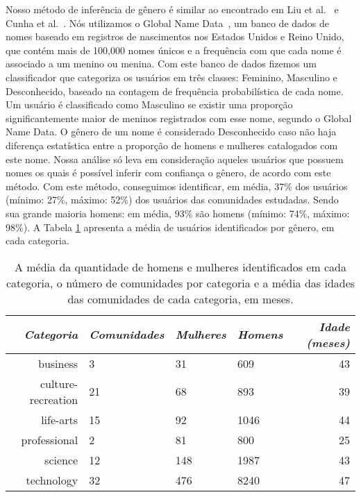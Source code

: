 Nosso método de inferência de gênero é similar ao encontrado em Liu et al.~\cite{liu2013s} e Cunha et al.~\cite{cunha2014he}. Nós utilizamos o Global Name Data~\cite{Hyland:2013:Online}, um banco de dados de nomes baseado em registros de nascimentos nos Estados Unidos e Reino Unido, que contém mais de 100,000 nomes únicos e a frequência com que cada nome é associado a um menino ou menina. Com este banco de dados fizemos um classificador que categoriza os usuários em três classes: Feminino, Masculino e Desconhecido, baseado na contagem de frequência probabilística de cada nome. Um usuário é classificado como Masculino se existir uma proporção significantemente maior de meninos registrados com esse nome, segundo o Global Name Data. O gênero de um nome é considerado Desconhecido caso não haja diferença estatística entre a proporção de homens e mulheres catalogados com este nome. Nossa análise só leva em consideração aqueles usuários que possuem nomes os quais é possível inferir com confiança o gênero, de acordo com este método. Com este método, conseguimos identificar, em média, 37\% dos usuários (mínimo: 27\%, máximo: 52\%) dos usuários das comunidades estudadas. Sendo sua grande maioria homens: em média, 93\% são homens (mínimo: 74\%, máximo: 98\%). A Tabela \ref{table:categories} apresenta a média de usuários identificados por gênero, em cada categoria.

\begin{table}[h]
\centering
\begin{tabular}{@{}rlllr@{}}
\toprule
{\small\textit{Categoria}} & {\small \textit{Comunidades}} & {\small \textit{Mulheres}} & {\small \textit{Homens}} & {\small \textit{Idade (meses)}} \\ \midrule
business           & 3  & 31  & 609  & 43 \\
culture-recreation & 21 & 68  & 893  & 39 \\
life-arts          & 15 & 92  & 1046 & 44 \\
professional       & 2  & 81  & 800  & 25 \\
science            & 12 & 148 & 1987 & 43 \\
technology         & 32 & 476 & 8240 & 47 \\ \bottomrule
\end{tabular}
\caption[Média de usuários identificados por categoria]{A média da quantidade de homens e mulheres identificados em cada categoria, o número de comunidades por categoria e a média das idades das comunidades de cada categoria, em meses.}~\label{table:categories}
\end{table}

